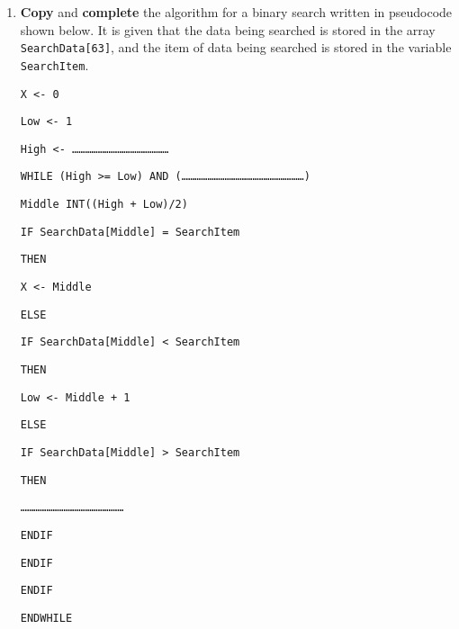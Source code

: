 \begin{enumerate}
\item \textbf{Copy} and \textbf{complete} the algorithm for a binary search
written in pseudocode shown below. It is given that the data being
searched is stored in the array \texttt{SearchData{[}63{]}}, and the
item of data being searched is stored in the variable \texttt{SearchItem}. 

\noindent %
\noindent\begin{minipage}[t]{1\columnwidth}%
\texttt{X <- 0 }

\texttt{Low <- 1 }

\texttt{High <- \dots \dots \dots \dots \dots \dots \dots \dots \dots \dots \dots \dots \dots \dots \dots{} }

\texttt{WHILE (High >= Low) AND (\dots \dots \dots \dots \dots \dots \dots \dots \dots \dots \dots \dots \dots \dots \dots \dots \dots \dots \dots )}

\texttt{\qquad{}Middle INT((High + Low)/2) }

\texttt{\qquad{}IF SearchData{[}Middle{]} = SearchItem }

\texttt{\qquad{}\qquad{}THEN }

\texttt{\qquad{}\qquad{}\qquad{}X <- Middle }

\texttt{\qquad{}\qquad{}ELSE}

\texttt{\qquad{}\qquad{}\qquad{}IF SearchData{[}Middle{]} < SearchItem }

\texttt{\qquad{}\qquad{}\qquad{}\qquad{}THEN}

\texttt{\qquad{}\qquad{}\qquad{}\qquad{}\qquad{}Low <- Middle
+ 1}

\texttt{\qquad{}\qquad{}\qquad{}\qquad{}ELSE }

\texttt{\qquad{}\qquad{}\qquad{}\qquad{}\qquad{}IF SearchData{[}Middle{]}
> SearchItem }

\texttt{\qquad{}\qquad{}\qquad{}\qquad{}\qquad{}\qquad{}THEN}

\texttt{\qquad{}\qquad{}\qquad{}\qquad{}\qquad{}\qquad{}\qquad{}\dots \dots \dots \dots \dots \dots \dots \dots \dots \dots \dots \dots \dots \dots \dots \dots{} }

\texttt{\qquad{}\qquad{}\qquad{}\qquad{}\qquad{}ENDIF }

\texttt{\qquad{}\qquad{}\qquad{}ENDIF }

\texttt{\qquad{}ENDIF }

\texttt{ENDWHILE }%
\end{minipage}


\end{enumerate}
